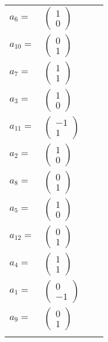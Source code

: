 \documentclass[1p]{elsarticle_modified}
\theoremstyle{definition}
\begin{document}
\begin{tabular}{m{7pt} m{180pt} m{7pt} m{180pt} }
\flushright $a_{6}=$&$\begin{pmatrix}1\\0\end{pmatrix}$ \\
\flushright $a_{10}=$&$\begin{pmatrix}0\\1\end{pmatrix}$ \\
\flushright $a_{7}=$&$\begin{pmatrix}1\\1\end{pmatrix}$ \\
\flushright $a_{3}=$&$\begin{pmatrix}1\\0\end{pmatrix}$ \\
\flushright $a_{11}=$&$\begin{pmatrix}-1\\1\end{pmatrix}$ \\
\flushright $a_{2}=$&$\begin{pmatrix}1\\0\end{pmatrix}$ \\
\flushright $a_{8}=$&$\begin{pmatrix}0\\1\end{pmatrix}$ \\
\flushright $a_{5}=$&$\begin{pmatrix}1\\0\end{pmatrix}$ \\
\flushright $a_{12}=$&$\begin{pmatrix}0\\1\end{pmatrix}$ \\
\flushright $a_{4}=$&$\begin{pmatrix}1\\1\end{pmatrix}$ \\
\flushright $a_{1}=$&$\begin{pmatrix}0\\-1\end{pmatrix}$ \\
\flushright $a_{9}=$&$\begin{pmatrix}0\\1\end{pmatrix}$\\&\end{tabular}
\end{document}
